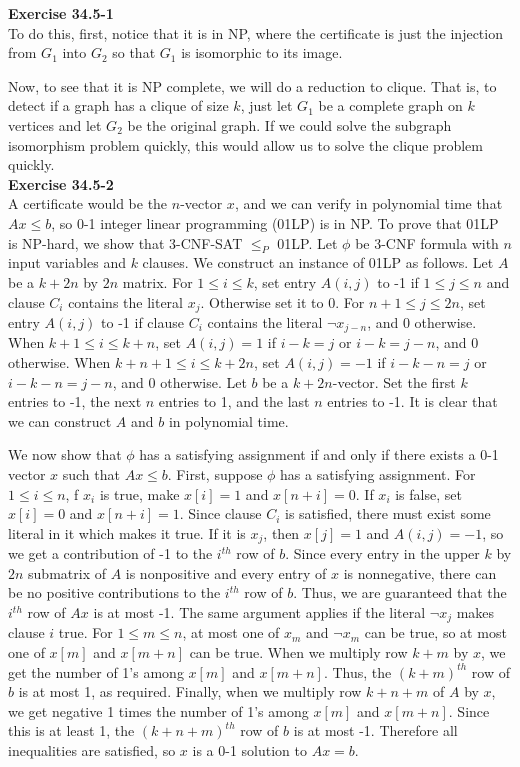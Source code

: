 \documentclass{article}
\begin{document}
\noindent\textbf{Exercise 34.5-1}\\

To do this, first, notice that it is in NP, where the certificate is just the injection from $G_1$ into $G_2$ so that $G_1$ is isomorphic to its image.

Now, to see that it is NP complete, we will do a reduction to clique. That is, to detect if a graph has a clique of size $k$, just let $G_1$ be a complete graph on $k$ vertices and let $G_2$ be the original graph. If we could solve the subgraph isomorphism problem quickly, this would allow us to solve the clique problem quickly.\\

\noindent\textbf{Exercise 34.5-2}\\

A certificate would be the $n$-vector $x$, and we can verify in polynomial time that $Ax \leq b$, so 0-1 integer linear programming (01LP) is in NP.  To prove that 01LP is NP-hard, we show that 3-CNF-SAT $\leq_P$ 01LP.  Let $\phi$ be 3-CNF formula with $n$ input variables and $k$ clauses.  We construct an instance of 01LP as follows.  Let $A$ be a $k+2n$ by $2n$ matrix.  For $1 \leq i \leq k$, set entry $A(i,j)$ to -1 if $1 \leq j \leq n$ and clause $C_i$ contains the literal $x_j$.  Otherwise set it to 0.  For $n+1 \leq j \leq 2n$, set entry $A(i,j)$ to -1 if clause $C_i$ contains the literal $\neg x_{j-n}$, and 0 otherwise.  When $k+1 \leq i \leq k+n$, set $A(i,j) = 1$ if $i-k = j$ or $i-k = j-n$, and 0 otherwise.  When $k+n+1 \leq i \leq k+2n$, set $A(i,j) = -1$ if $i - k - n = j$ or $i - k - n = j - n$, and 0 otherwise. Let $b$ be a $k + 2n$-vector. Set the first $k$ entries to -1, the next $n$ entries to 1, and the last $n$ entries to -1.  It is clear that we can construct $A$ and $b$ in polynomial time. 

We now show that $\phi$ has a satisfying assignment if and only if there exists a 0-1 vector $x$ such that $Ax \leq b$.  First, suppose $\phi$ has a satisfying assignment.  For $1 \leq i \leq n$, f $x_i$ is true, make $x[i] = 1$ and $x[n+i] = 0$.  If $x_i$ is false, set $x[i] = 0$ and $x[n+i] = 1$.  Since clause $C_i$ is satisfied, there must exist some literal in it which makes it true. If it is $x_j$, then $x[j] = 1$ and $A(i,j) = -1$, so we get a contribution of -1 to the $i^{th}$ row of $b$.  Since every entry in the upper $k$ by $2n$ submatrix of $A$ is nonpositive and every entry of $x$ is nonnegative, there can be no positive contributions to the $i^{th}$ row of $b$.  Thus, we are guaranteed that the $i^{th}$ row of $Ax$ is at most -1.  The same argument applies if the literal $\neg x_j$ makes clause $i$ true.  For $1 \leq m \leq n$, at most one of $x_m$ and $\neg x_m$ can be true, so at most one of $x[m]$ and $x[m+n]$ can be true.  When we multiply row $k+m$ by $x$, we get the number of 1's among $x[m]$ and $x[m+n]$. Thus, the $(k+m)^{th}$ row of $b$ is at most 1, as required.  Finally, when we multiply row $k+n+m$ of $A$ by $x$, we get negative 1 times the number of 1's among $x[m]$ and $x[m+n]$.  Since this is at least 1, the $(k+n+m)^{th}$ row of $b$ is at most -1.  Therefore all inequalities are satisfied, so $x$ is a 0-1 solution to $Ax=b$.
\end{document}

